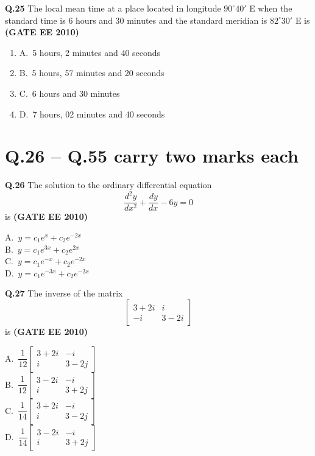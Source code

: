 \documentclass[journal,12pt,onecolumn]{exam}
\theoremstyle{remark}
\begin{document}
\noindent\textbf{Q.25} The local mean time at a place located in longitude $90^\circ40'$ E when the standard time is 6 hours and 30 minutes and the standard meridian is $82^\circ30'$ E is
\hfill\textbf{(GATE EE 2010)}
\begin{enumerate}[label=]
\item A.\ 5 hours, 2 minutes and 40 seconds \\
\item B.\ 5 hours, 57 minutes and 20 seconds \\
\item C.\ 6 hours and 30 minutes \\
\item D.\ 7 hours, 02 minutes and 40 seconds
\end{enumerate}

\raggedright
    
\section*{Q.26 -- Q.55 carry two marks each}

\noindent\textbf{Q.26} The solution to the ordinary differential equation
\[
\frac{d^2y}{dx^2} + \frac{dy}{dx} - 6y = 0
\]
is
\hfill\textbf{(GATE EE 2010)}
\begin{multicols}{4}
A.\ $y = c_1 e^x + c_2 e^{-2x}$ \\
B.\ $y = c_1 e^{3x} + c_2 e^{2x}$ \\
C.\ $y = c_1 e^{-x} + c_2 e^{-2x}$ \\
D.\ $y = c_1 e^{-3x} + c_2 e^{-2x}$
\end{multicols}

\textbf{Q.27} The inverse of the matrix
\[
\begin{bmatrix}
3+2i & i \\
-i & 3-2i
\end{bmatrix}
\]
is
\hfill\textbf{(GATE EE 2010)}
\begin{multicols}{4}
A.\ $\dfrac{1}{12} \begin{bmatrix} 3+2i & -i \\ i & 3-2j \end{bmatrix}$ \\
B.\ $\dfrac{1}{12} \begin{bmatrix} 3-2i & -i \\ i & 3+2j \end{bmatrix}$ \\
C.\ $\dfrac{1}{14} \begin{bmatrix} 3+2i & -i \\ i & 3-2j \end{bmatrix}$ \\
D.\ $\dfrac{1}{14} \begin{bmatrix} 3-2i & -i \\ i & 3+2j \end{bmatrix}$
\end{multicols}
\end{document}
